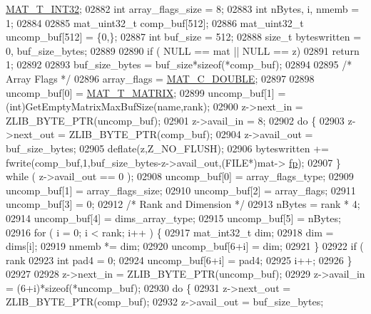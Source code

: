 \begin{DoxyCode}
{{{{{{{{{{{{{{{{      \hyperlink{group___m_a_t_ggacf7b3b879282b7ab3a51190e49bf3453a83e06a68320726c6572bfbb9f3addb1d}{MAT\_T\_INT32};
02882     \textcolor{keywordtype}{int} array\_flags\_size = 8;
02883     \textcolor{keywordtype}{int} nBytes, i, nmemb = 1;
02884 
02885     mat\_uint32\_t comp\_buf[512];
02886     mat\_uint32\_t uncomp\_buf[512] = \{0,\};
02887     \textcolor{keywordtype}{int} buf\_size = 512;
02888     \textcolor{keywordtype}{size\_t} byteswritten = 0, buf\_size\_bytes;
02889 
02890     \textcolor{keywordflow}{if} ( NULL == mat || NULL == z)
02891         \textcolor{keywordflow}{return} 1;
02892 
02893     buf\_size\_bytes = buf\_size*\textcolor{keyword}{sizeof}(*comp\_buf);
02894 
02895     \textcolor{comment}{/* Array Flags */}
02896     array\_flags = \hyperlink{group___m_a_t_ggad4d60ae7b709fc81bfd744fb4c857c40a5d70e0862e5bdb7bd86bf7ba5948f307}{MAT\_C\_DOUBLE};
02897 
02898     uncomp\_buf[0] = \hyperlink{group___m_a_t_ggacf7b3b879282b7ab3a51190e49bf3453a32985fee89a4df8db4b3f5d3a48823d3}{MAT\_T\_MATRIX};
02899     uncomp\_buf[1] = (int)GetEmptyMatrixMaxBufSize(name,rank);
02900     z->next\_in  = ZLIB\_BYTE\_PTR(uncomp\_buf);
02901     z->avail\_in = 8;
02902     \textcolor{keywordflow}{do} \{
02903         z->next\_out  = ZLIB\_BYTE\_PTR(comp\_buf);
02904         z->avail\_out = buf\_size\_bytes;
02905         deflate(z,Z\_NO\_FLUSH);
02906         byteswritten += fwrite(comp\_buf,1,buf\_size\_bytes-z->avail\_out,(FILE*)mat->
      \hyperlink{struct__mat__t_a85f562e407ca9ad4d2a6e14f839432b7}{fp});
02907     \} \textcolor{keywordflow}{while} ( z->avail\_out == 0 );
02908     uncomp\_buf[0] = array\_flags\_type;
02909     uncomp\_buf[1] = array\_flags\_size;
02910     uncomp\_buf[2] = array\_flags;
02911     uncomp\_buf[3] = 0;
02912     \textcolor{comment}{/* Rank and Dimension */}
02913     nBytes = rank * 4;
02914     uncomp\_buf[4] = dims\_array\_type;
02915     uncomp\_buf[5] = nBytes;
02916     \textcolor{keywordflow}{for} ( i = 0; i < rank; i++ ) \{
02917         mat\_int32\_t dim;
02918         dim = dims[i];
02919         nmemb *= dim;
02920         uncomp\_buf[6+i] = dim;
02921     \}
02922     \textcolor{keywordflow}{if} ( rank %
02923         \textcolor{keywordtype}{int} pad4 = 0;
02924         uncomp\_buf[6+i] = pad4;
02925         i++;
02926     \}
02927 
02928     z->next\_in  = ZLIB\_BYTE\_PTR(uncomp\_buf);
02929     z->avail\_in = (6+i)*\textcolor{keyword}{sizeof}(*uncomp\_buf);
02930     \textcolor{keywordflow}{do} \{
02931         z->next\_out  = ZLIB\_BYTE\_PTR(comp\_buf);
02932         z->avail\_out = buf\_size\_bytes;
}}}}}}}}}}}}}}}}
\end{DoxyCode}
